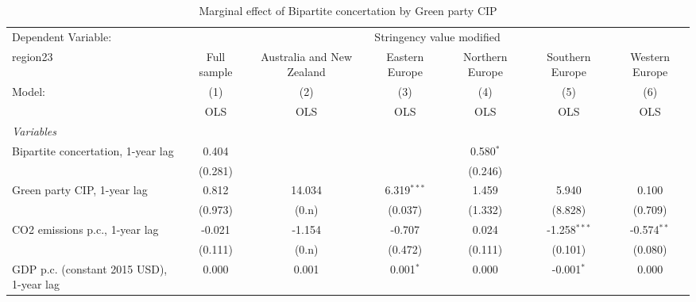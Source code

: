 
\begin{table}[htbp]
   \caption{Marginal effect of Bipartite concertation by Green party CIP}
   \centering
   \begin{tabular}{lcccccc}
      \toprule
      Dependent Variable: & \multicolumn{6}{c}{Stringency value modified}\\
      region23                                                         & Full sample   & Australia and New Zealand & Eastern Europe & Northern Europe & Southern Europe & Western Europe \\   
      Model:                                                           & (1)           & (2)                       & (3)            & (4)             & (5)             & (6)\\  
                                                                       &  OLS          & OLS                       & OLS            & OLS             & OLS             & OLS\\  
      \midrule
      \emph{Variables}\\
      Bipartite concertation, 1-year lag                               & 0.404         &                           &                & 0.580$^{*}$     &                 &   \\   
                                                                       & (0.281)       &                           &                & (0.246)         &                 &   \\   
      Green party CIP, 1-year lag                                      & 0.812         & 14.034                    & 6.319$^{***}$  & 1.459           & 5.940           & 0.100\\   
                                                                       & (0.973)       & (0.n)                     & (0.037)        & (1.332)         & (8.828)         & (0.709)\\   
      CO2 emissions p.c., 1-year lag                                   & -0.021        & -1.154                    & -0.707         & 0.024           & -1.258$^{***}$  & -0.574$^{**}$\\   
                                                                       & (0.111)       & (0.n)                     & (0.472)        & (0.111)         & (0.101)         & (0.080)\\   
      GDP p.c. (constant 2015 USD), 1-year lag                         & 0.000         & 0.001                     & 0.001$^{*}$    & 0.000           & -0.001$^{*}$    & 0.000\\   

\end{tabular}
\end{table}
